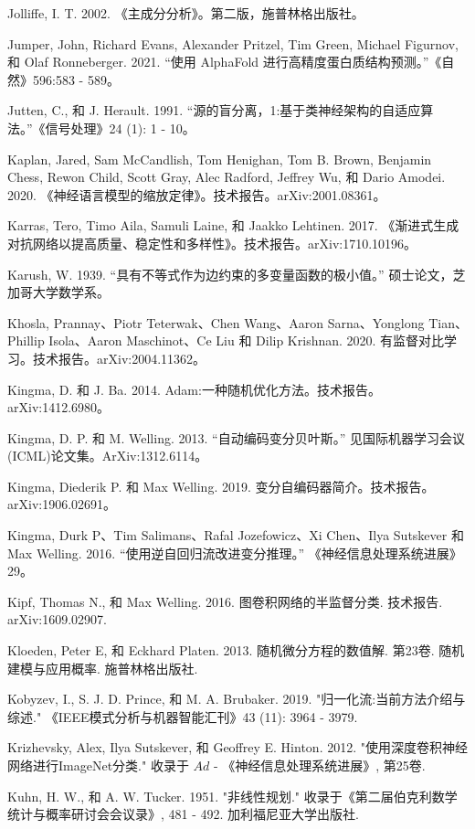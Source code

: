 \documentclass[10pt]{report}
\begin{document}
Jolliffe, I. T. 2002. 《主成分分析》。第二版，施普林格出版社。

Jumper, John, Richard Evans, Alexander Pritzel, Tim Green, Michael Figurnov, 和 Olaf Ronneberger. 2021. “使用 AlphaFold 进行高精度蛋白质结构预测。”《自然》596:583 - 589。

Jutten, C., 和 J. Herault. 1991. “源的盲分离，1:基于类神经架构的自适应算法。”《信号处理》24 (1): 1 - 10。

Kaplan, Jared, Sam McCandlish, Tom Henighan, Tom B. Brown, Benjamin Chess, Rewon Child, Scott Gray, Alec Radford, Jeffrey Wu, 和 Dario Amodei. 2020. 《神经语言模型的缩放定律》。技术报告。arXiv:2001.08361。

Karras, Tero, Timo Aila, Samuli Laine, 和 Jaakko Lehtinen. 2017. 《渐进式生成对抗网络以提高质量、稳定性和多样性》。技术报告。arXiv:1710.10196。

Karush, W. 1939. “具有不等式作为边约束的多变量函数的极小值。” 硕士论文，芝加哥大学数学系。

Khosla, Prannay、Piotr Teterwak、Chen Wang、Aaron Sarna、Yonglong Tian、Phillip Isola、Aaron Maschinot、Ce Liu 和 Dilip Krishnan. 2020. 有监督对比学习。技术报告。arXiv:2004.11362。

Kingma, D. 和 J. Ba. 2014. Adam:一种随机优化方法。技术报告。arXiv:1412.6980。

Kingma, D. P. 和 M. Welling. 2013. “自动编码变分贝叶斯。” 见国际机器学习会议(ICML)论文集。ArXiv:1312.6114。

Kingma, Diederik P. 和 Max Welling. 2019. 变分自编码器简介。技术报告。arXiv:1906.02691。

Kingma, Durk P、Tim Salimans、Rafal Jozefowicz、Xi Chen、Ilya Sutskever 和 Max Welling. 2016. “使用逆自回归流改进变分推理。” 《神经信息处理系统进展》29。

Kipf, Thomas N., 和 Max Welling. 2016. 图卷积网络的半监督分类. 技术报告. arXiv:1609.02907.

Kloeden, Peter E, 和 Eckhard Platen. 2013. 随机微分方程的数值解. 第23卷. 随机建模与应用概率. 施普林格出版社.

Kobyzev, I., S. J. D. Prince, 和 M. A. Brubaker. 2019. "归一化流:当前方法介绍与综述." 《IEEE模式分析与机器智能汇刊》43 (11): 3964 - 3979.

Krizhevsky, Alex, Ilya Sutskever, 和 Geoffrey E. Hinton. 2012. "使用深度卷积神经网络进行ImageNet分类." 收录于 \({Ad}\) - 《神经信息处理系统进展》, 第25卷.

Kuhn, H. W., 和 A. W. Tucker. 1951. "非线性规划." 收录于《第二届伯克利数学统计与概率研讨会会议录》, 481 - 492. 加利福尼亚大学出版社.
\end{document}
